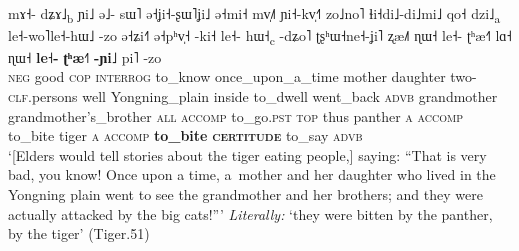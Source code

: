\begin{exe}
	\ex
	\label{ex:bite} 
	\\
	\gll mɤ˧-	dʑɤ˩\textsubscript{b}	ɲi˩		ə˩-		sɯ˥		ə˧ʝi˧-ʂɯ˥ʝi˩									ə˧mi˧		mv̩˩˥	ɲi˧-kv̩˧˥		zo˩no˥		ɬi˧di˩-di˩mi˩		qo˧		dzi˩\textsubscript{a}		le˧-wo˥le˧-hɯ˩		-zo		ə˧ʑi˧˥		ə˧pʰv̩˧		-ki˧	le˧-		hɯ˧\textsubscript{c}		-dʑo˥			ʈʂʰɯ˧ne˧-ʝi˥	ʐæ˩˥		ɳɯ˧	le˧-		ʈʰæ˧˥		lɑ˧		ɳɯ˧		\textbf{le˧-}	\textbf{ʈʰæ˧˥}		\textbf{-ɲi˩}		pi˥		-zo\\
	\textsc{neg}	good	\textsc{cop}	\textsc{interrog}	to\_know		once\_upon\_a\_time		mother		daughter	two-\textsc{clf}.persons	well	Yongning\_plain		inside		to\_dwell		went\_back		\textsc{advb}	grandmother		grandmother’s\_brother		 \textsc{all}		\textsc{accomp}		to\_go.\textsc{pst}		\textsc{top}	thus		panther	\textsc{a}	\textsc{accomp}			to\_bite 		tiger		\textsc{a}	\textsc{accomp}			\textbf{to\_bite}		\textbf{\textsc{certitude}}		to\_say		\textsc{advb}\\
	\glt ‘[Elders would tell stories about the tiger eating people,] saying: “That is very bad, you know! Once upon a time, a~mother and her daughter who lived in the Yongning plain went to see the grandmother and her brothers; and they were actually attacked by the big cats!”’ \textit{Literally:} ‘they were bitten by the panther, by the tiger’ (Tiger.51)
\end{exe}

